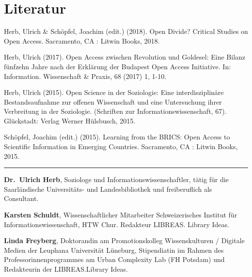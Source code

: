 \documentclass[a4paper,
fontsize=11pt,
oneside,
numbers=noperiodatend,
parskip=half-,
bibliography=totoc,
final
]{scrartcl}
\begin{document}
\hypertarget{literatur}{%
\section*{Literatur}\label{literatur}}

Herb, Ulrich \& Schöpfel, Joachim (edit.) (2018). Open Divide? Critical
Studies on Open Access. Sacramento, CA : Litwin Books, 2018.

Herb, Ulrich (2017). Open Access zwischen Revolution und Goldesel: Eine
Bilanz fünfzehn Jahre nach der Erklärung der Budapest Open Access
Initiative. In: Information. Wissenschaft \& Praxis, 68 (2017) 1, 1-10.

Herb, Ulrich (2015). Open Science in der Soziologie: Eine
interdisziplinäre Bestandsaufnahme zur offenen Wissenschaft und eine
Untersuchung ihrer Verbreitung in der Soziologie. (Schriften zur
Informationswissenschaft, 67). Glückstadt: Verlag Werner Hülsbusch,
2015.

Schöpfel, Joachim (edit.) (2015). Learning from the BRICS: Open Access
to Scientific Information in Emerging Countries. Sacramento, CA : Litwin
Books, 2015.

\begin{center}\rule{0.5\linewidth}{\linethickness}\end{center}

\textbf{Dr.~Ulrich Herb}, Soziologe und Informationswissenschaftler,
tätig für die Saarländische Universitäts- und Landesbibliothek und
freiberuflich als Consultant.

\textbf{Karsten Schuldt}, Wissenschaftlicher Mitarbeiter Schweizerisches
Institut für Informationswissenschaft, HTW Chur. Redakteur LIBREAS.
Library Ideas.

\textbf{Linda Freyberg}, Doktorandin am Promotionskolleg Wissenskulturen
/ Digitale Medien der Leuphana Universität Lüneburg, Stipendiatin im
Rahmen des Professorinnenprogrammes am Urban Complexity Lab (FH Potsdam)
und Redakteurin der LIBREAS.Library Ideas.
\end{document}
